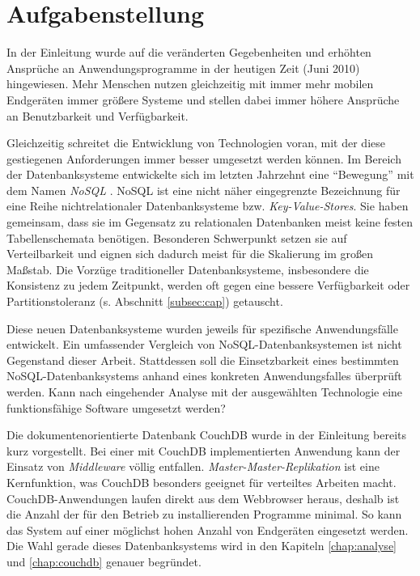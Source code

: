 \chapter{Aufgabenstellung}
\label{chap:aufgabenstellung}

In der Einleitung wurde auf die veränderten Gegebenheiten und erhöhten Ansprüche an Anwendungsprogramme in der heutigen Zeit (Juni 2010) hingewiesen. Mehr Menschen nutzen gleichzeitig mit immer mehr mobilen Endgeräten immer größere Systeme und stellen dabei immer höhere Ansprüche an Benutzbarkeit und Verfügbarkeit.

Gleichzeitig schreitet die Entwicklung von Technologien voran, mit der diese gestiegenen Anforderungen immer besser umgesetzt werden können. Im Bereich der Datenbanksysteme entwickelte sich im letzten Jahrzehnt eine \enquote{Bewegung} mit dem Namen \textit{NoSQL} \cite{nosql:strozzi}. NoSQL ist eine nicht näher eingegrenzte Bezeichnung für eine Reihe nichtrelationaler Datenbanksysteme bzw. \textit{Key-Value-Stores}. Sie haben gemeinsam, dass sie im Gegensatz zu relationalen Datenbanken meist keine festen Tabellenschemata benötigen. Besonderen Schwerpunkt setzen sie auf Verteilbarkeit und eignen sich dadurch meist für die Skalierung im großen Maßstab. Die Vorzüge traditioneller Datenbanksysteme, insbesondere die Konsistenz zu jedem Zeitpunkt, werden oft gegen eine bessere Verfügbarkeit oder Partitionstoleranz (s. Abschnitt \ref{subsec:cap}) getauscht.

Diese neuen Datenbanksysteme wurden jeweils für spezifische Anwendungsfälle entwickelt. Ein umfassender Vergleich von NoSQL-Datenbanksystemen ist nicht Gegenstand dieser Arbeit. Stattdessen soll die Einsetzbarkeit eines bestimmten NoSQL-Datenbanksystems anhand eines konkreten Anwendungsfalles überprüft werden. Kann nach eingehender Analyse mit der ausgewählten Technologie eine funktionsfähige Software umgesetzt werden?

Die dokumentenorientierte Datenbank CouchDB \cite{couch:homepage} wurde in der Einleitung bereits kurz vorgestellt. Bei einer mit CouchDB implementierten Anwendung kann der Einsatz von \textit{Middleware} völlig entfallen. \textit{Master-Master-Replikation} ist eine Kernfunktion, was CouchDB besonders geeignet für verteiltes Arbeiten macht. CouchDB-Anwendungen laufen direkt aus dem Webbrowser heraus, deshalb ist die Anzahl der für den Betrieb zu installierenden Programme minimal. So kann das System auf einer möglichst hohen Anzahl von Endgeräten eingesetzt werden. Die Wahl gerade dieses Datenbanksystems wird in den Kapiteln \ref{chap:analyse} und \ref{chap:couchdb} genauer begründet. 

